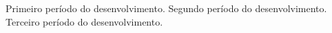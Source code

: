 
Primeiro período do desenvolvimento. Segundo período do desenvolvimento. Terceiro período do desenvolvimento.
